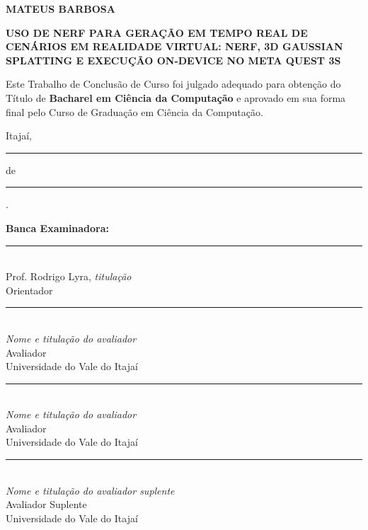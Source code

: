 \begin{center}
    \textbf{MATEUS BARBOSA}

    \vspace{0.7cm}

    \textbf{USO DE NERF PARA GERAÇÃO EM TEMPO REAL DE CENÁRIOS EM REALIDADE VIRTUAL: NERF, 3D GAUSSIAN SPLATTING E EXECUÇÃO ON-DEVICE NO META QUEST 3S}

    \vspace{0.7cm}

    Este Trabalho de Conclusão de Curso foi julgado adequado para obtenção do Título de
    \textbf{Bacharel em Ciência da Computação} e aprovado em sua forma final pelo Curso de
    Graduação em Ciência da Computação.

    \vspace{0.3cm}

    Itajaí, \rule{3cm}{0.4pt} de \rule{1.5cm}{0.4pt}.

    \vspace{0.4cm}

    \textbf{Banca Examinadora:}

    \vspace{0.3cm}

    \rule{0.72\textwidth}{0.4pt}\\
    Prof. Rodrigo Lyra, \textit{titulação}\\
    Orientador

    \vspace{0.3cm}

    \rule{0.72\textwidth}{0.4pt}\\
    \textit{Nome e titulação do avaliador}\\
    Avaliador\\
    Universidade do Vale do Itajaí

    \vspace{0.3cm}

    \rule{0.72\textwidth}{0.4pt}\\
    \textit{Nome e titulação do avaliador}\\
    Avaliador\\
    Universidade do Vale do Itajaí

    \vspace{0.3cm}

    \rule{0.72\textwidth}{0.4pt}\\
    \textit{Nome e titulação do avaliador suplente}\\
    Avaliador Suplente\\
    Universidade do Vale do Itajaí
\end{center}

\clearpage
